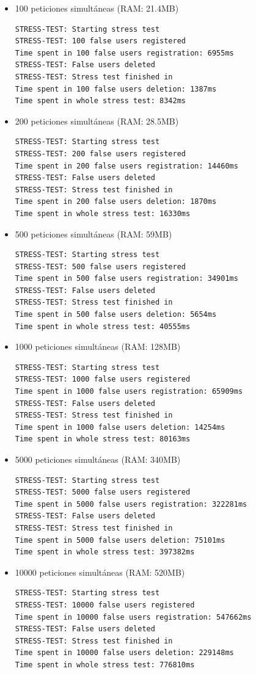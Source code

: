 \begin{itemize}
\item 100 peticiones simultáneas (RAM: 21.4MB)
  \begin{lstlisting}
STRESS-TEST: Starting stress test
STRESS-TEST: 100 false users registered
Time spent in 100 false users registration: 6955ms
STRESS-TEST: False users deleted
STRESS-TEST: Stress test finished in 
Time spent in 100 false users deletion: 1387ms
Time spent in whole stress test: 8342ms
  \end{lstlisting}

\item 200 peticiones simultáneas (RAM: 28.5MB)
  \begin{lstlisting}
STRESS-TEST: Starting stress test
STRESS-TEST: 200 false users registered
Time spent in 200 false users registration: 14460ms
STRESS-TEST: False users deleted
STRESS-TEST: Stress test finished in 
Time spent in 200 false users deletion: 1870ms
Time spent in whole stress test: 16330ms
  \end{lstlisting}

\item 500 peticiones simultáneas (RAM: 59MB)
  \begin{lstlisting}
STRESS-TEST: Starting stress test
STRESS-TEST: 500 false users registered
Time spent in 500 false users registration: 34901ms
STRESS-TEST: False users deleted
STRESS-TEST: Stress test finished in 
Time spent in 500 false users deletion: 5654ms
Time spent in whole stress test: 40555ms
  \end{lstlisting}

\item 1000 peticiones simultáneas (RAM: 128MB)
  \begin{lstlisting}
STRESS-TEST: Starting stress test
STRESS-TEST: 1000 false users registered
Time spent in 1000 false users registration: 65909ms
STRESS-TEST: False users deleted
STRESS-TEST: Stress test finished in 
Time spent in 1000 false users deletion: 14254ms
Time spent in whole stress test: 80163ms
  \end{lstlisting}

\item 5000 peticiones simultáneas (RAM: 340MB)
  \begin{lstlisting}
STRESS-TEST: Starting stress test
STRESS-TEST: 5000 false users registered
Time spent in 5000 false users registration: 322281ms
STRESS-TEST: False users deleted
STRESS-TEST: Stress test finished in 
Time spent in 5000 false users deletion: 75101ms
Time spent in whole stress test: 397382ms
  \end{lstlisting}

\item 10000 peticiones simultáneas (RAM: 520MB)
  \begin{lstlisting}
STRESS-TEST: Starting stress test
STRESS-TEST: 10000 false users registered
Time spent in 10000 false users registration: 547662ms
STRESS-TEST: False users deleted
STRESS-TEST: Stress test finished in 
Time spent in 10000 false users deletion: 229148ms
Time spent in whole stress test: 776810ms
  \end{lstlisting}

\end{itemize}

